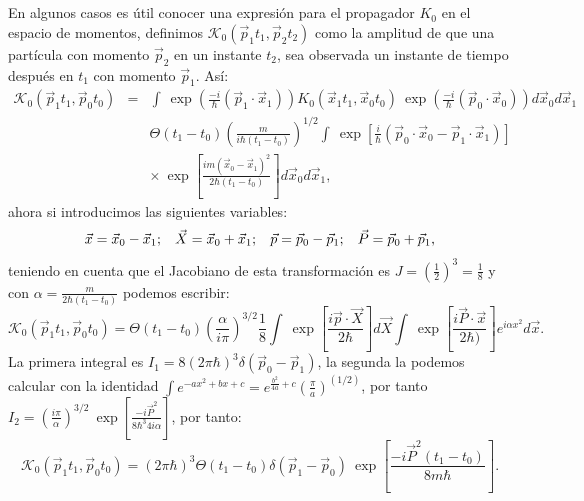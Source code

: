 \\
\\
En algunos casos es útil conocer una expresión para el propagador  $K_0$ en el espacio de momentos, definimos $\mathcal{K}_0(\vec{p}_1t_1,\vec{p}_2t_2)$ como la amplitud de que una partícula con momento $\vec{p}_2$ en un instante $t_2$, sea observada un instante de tiempo después en $t_1$ con momento $\vec{p}_1$. Así:
\begin{eqnarray}
\nonumber \mathcal{K}_0(\vec{p}_1t_1,\vec{p}_0t_0)&=&\int \ \exp\left(\frac{-i}{\hbar}(\vec{p}_1\cdot\vec{x}_1)\right) K_0(\vec{x}_1t_1,\vec{x}_0t_0)\ \exp\left(\frac{-i}{\hbar}(\vec{p}_0\cdot\vec{x}_0)\right)d\vec{x}_0d\vec{x}_1\\
&&\nonumber \Theta(t_{1}-t_{0})\left(\frac{m}{i\hbar(t_{1}-t_{0})}\right)^{1/2}\int\ \exp\left[\frac{i}{\hbar}(\vec{p}_{0}\cdot\vec{x}_{0}-\vec{p}_{1}\cdot\vec{x}_{1})\right]\\
&& \times \ \exp\left[\frac{im(\vec{x}_{0}-\vec{x}_{1})^{2}}{2\hbar(t_{1}-t_{0})}\right]d\vec{x}_{0}d\vec{x}_{1},
\end{eqnarray}
ahora si introducimos las siguientes variables:
\begin{equation}
\vec{x}=\vec{x}_0-\vec{x}_1;\hspace{0.3cm}\vec{X}=\vec{x}_0+\vec{x}_1;\hspace{0.3cm}\vec{p}=\vec{p}_0-\vec{p}_1;\hspace{0.3cm}\vec{P}=\vec{p}_0+\vec{p}_1 ,
\end{equation}
teniendo en cuenta que el Jacobiano de esta transformación es $J=\left(\frac{1}{2}\right)^3=\frac{1}{8}$ y con $\alpha=\frac{m}{2\hbar (t_1-t_0)}$  podemos escribir:
\begin{equation}
\mathcal{K}_0(\vec{p}_1t_1,\vec{p}_0t_0)=\Theta(t_{1}-t_{0})\left(\frac{\alpha}{i\pi}\right)^{3/2}\frac{1}{8}\int\ \exp\left[\frac{i\vec{p}\cdot\vec{X}}{2\hbar}\right]d\vec{X}\int\ \exp\left[\frac{i\vec{P}\cdot\vec{x}}{2\hbar)}\right]e^{i\alpha x^{2}}d\vec{x}.
\end{equation}
La primera integral es $I_1=8(2\pi\hbar)^3\delta(\vec{p}_0-\vec{p}_1)$, la segunda la podemos calcular con la identidad $ \int e^{-ax^2+bx+c}=e^{\frac{b^2}{4a}+c}\left(\frac{\pi}{a}\right)^(1/2)$, por tanto $I_2=\left(\frac{i\pi}{\alpha}\right)^{3/2}\ \exp\left[\frac{-i\vec{P}^{2}}{8\hbar^{3}4i\alpha}\right]$, por tanto:
\begin{equation}
\mathcal{K}_0(\vec{p}_1t_1,\vec{p}_0t_0)=(2\pi\hbar)^3\Theta(t_1-t_0)\delta(\vec{p}_1-\vec{p}_0)\ \exp\left[\frac{-i\vec{P}^{2}(t_{1}-t_{0})}{8m\hbar}\right].
\end{equation}
